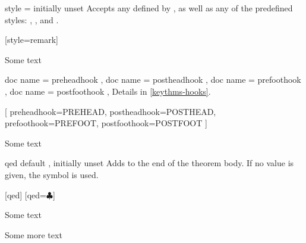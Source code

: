 \documentclass{ltxdoc}
\begin{document}
\begin{docKey}{style}
  {=}
  {initially unset}
Accepts any  defined by , as well as any of the predefined  styles: , , and .

\begin{tcbwritetemp}
[style=remark]
\end{tcbwritetemp}

\begin{keythmscode}[withpreamble]
\begin{remark}
Some text
\end{remark}
\end{keythmscode}

\end{docKey}

\begin{docKeys}[
  doc parameter = {=\meta{code}},
  doc description = initially unset,
  ]
  {
    { doc name = preheadhook },
    { doc name = postheadhook },
    { doc name = prefoothook },
    { doc name = postfoothook },
  }
Details in \autoref{keythms-hooks}.

\begin{tcbwritetemp}
[
  preheadhook=PREHEAD,
  postheadhook=POSTHEAD,
  prefoothook=PREFOOT,
  postfoothook=POSTFOOT
]
\end{tcbwritetemp}

\begin{keythmscode}[withpreamble]
\begin{test}
Some text
\end{test}
\end{keythmscode}

\end{docKeys}

\begin{docKey}{qed}
  {}
  {default , initially unset}
Adds  to the end of the theorem body.
If no value is given, the symbol \qedsymbol{} is used.

\begin{tcbwritetemp}
[qed]
[qed=$\clubsuit$]
\end{tcbwritetemp}

\begin{keythmscode}[withpreamble]
\begin{example}
Some text
\end{example}
\begin{solution}
Some more text
\end{solution}
\end{keythmscode}

\end{docKey}
\end{document}
